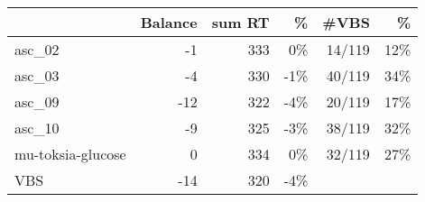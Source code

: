 \begin{tabular}{lrrrrr}
\toprule
 & Balance & sum RT &  \% & #VBS & \% \\
\midrule
asc_02 & -1 & 333 & 0\% & 14/119 & 12\% \\
asc_03 & -4 & 330 & -1\% & 40/119 & 34\% \\
asc_09 & -12 & 322 & -4\% & 20/119 & 17\% \\
asc_10 & -9 & 325 & -3\% & 38/119 & 32\% \\
mu-toksia-glucose & 0 & 334 & 0\% & 32/119 & 27\% \\
VBS & -14 & 320 & -4\% &  &  \\
\bottomrule
\end{tabular}
